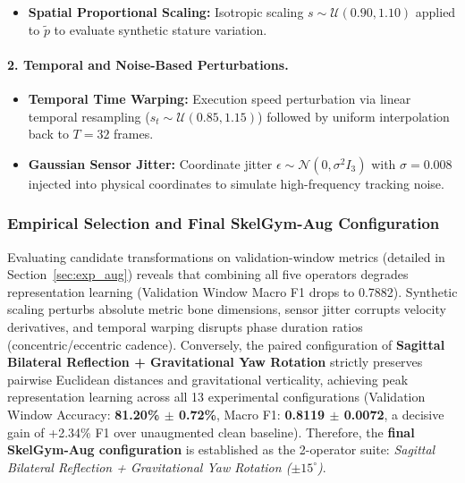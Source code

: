 \documentclass[runningheads]{llncs}
\begin{document}
\begin{itemize}
\begin{equation}
    \end{equation}
    Because $R_y(\alpha)$ acts strictly within the transverse plane, vertical displacement remains invariant ($\Delta y' = \Delta y$) and horizontal Euclidean radius is identically preserved:
    \begin{equation}
    \label{eq:yaw_invariance}
        \Delta x'^2 + \Delta z'^2 = (\Delta x \cos\alpha + \Delta z \sin\alpha)^2 + (-\Delta x \sin\alpha + \Delta z \cos\alpha)^2 = \Delta x^2 + \Delta z^2.
    \end{equation}
    Consequently, elevation angles satisfy $\theta' = \theta$, preserving biological limb inclination relative to gravity while teaching the network horizontal viewpoint invariance.
    \item \textbf{Spatial Proportional Scaling:} Isotropic scaling $s \sim \mathcal{U}(0.90, 1.10)$ applied to $\tilde{p}$ to evaluate synthetic stature variation.
\end{itemize}

\paragraph{2. Temporal and Noise-Based Perturbations.}
\begin{itemize}
    \item \textbf{Temporal Time Warping:} Execution speed perturbation via linear temporal resampling ($s_t \sim \mathcal{U}(0.85, 1.15)$) followed by uniform interpolation back to $T=32$ frames.
    \item \textbf{Gaussian Sensor Jitter:} Coordinate jitter $\epsilon \sim \mathcal{N}(0, \sigma^2 I_3)$ with $\sigma = 0.008$ injected into physical coordinates to simulate high-frequency tracking noise.
\end{itemize}

\subsubsection{Empirical Selection and Final SkelGym-Aug Configuration}
Evaluating candidate transformations on validation-window metrics (detailed in Section~\ref{sec:exp_aug}) reveals that combining all five operators degrades representation learning (Validation Window Macro F1 drops to 0.7882). Synthetic scaling perturbs absolute metric bone dimensions, sensor jitter corrupts velocity derivatives, and temporal warping disrupts phase duration ratios (concentric/eccentric cadence). Conversely, the paired configuration of \textbf{Sagittal Bilateral Reflection + Gravitational Yaw Rotation} strictly preserves pairwise Euclidean distances and gravitational verticality, achieving peak representation learning across all 13 experimental configurations (Validation Window Accuracy: \textbf{81.20\% $\pm$ 0.72\%}, Macro F1: \textbf{0.8119 $\pm$ 0.0072}, a decisive gain of +2.34\% F1 over unaugmented clean baseline). Therefore, the \textbf{final SkelGym-Aug configuration} is established as the 2-operator suite: \textit{Sagittal Bilateral Reflection + Gravitational Yaw Rotation ($\pm 15^\circ$)}.
\end{document}
